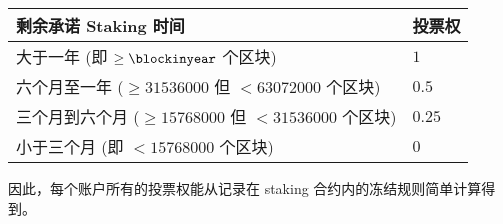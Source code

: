 \par
\begin{center}
\begin{tabular}{ll}
\toprule
剩余承诺 Staking 时间 & 投票权 \\
\midrule
大于一年 (即 $\ge \blockinyear$ 个区块) & $1$  \\
六个月至一年 ($\ge 31536000$ 但 $<63072000$ 个区块) & $0.5$ \\
三个月到六个月 ($\ge 15768000$ 但 $<31536000$ 个区块) & $0.25$\\
小于三个月 (即 $< 15768000$ 个区块) & $0$ \\
\bottomrule
\end{tabular}
\end{center}
\par
因此，每个账户所有的投票权能从记录在 staking 合约内的冻结规则简单计算得到。
